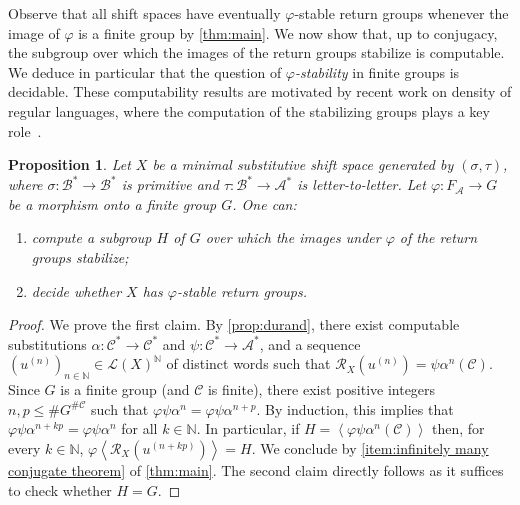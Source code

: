 \documentclass{amsart}
\newcommand*{\N}{\mathbb{N}}
\newcommand*{\ret}{\mathcal{R}}
\newcommand*{\lang}{\mathcal{L}}
\newcommand*{\cA}{\mathcal{A}}
\newcommand*{\cB}{\mathcal{B}}
\newcommand*{\cC}{\mathcal{C}}
\newcommand*{\from}{\colon}
\newcommand*{\card}{\#}
\newcommand*{\gen}[1]{\left\langle #1\right\rangle}
\theoremstyle{plain}
\newtheorem{proposition}[theorem]{Proposition}
\theoremstyle{definition}
\theoremstyle{remark}
\begin{document}
Observe that all shift spaces have eventually $\varphi$-stable return groups whenever the image of $\varphi$ is a finite group by \cref{thm:main}. We now show that, up to conjugacy, the subgroup over which the images of the return groups stabilize is computable. We deduce in particular that the question of \emph{$\varphi$-stability} in finite groups is decidable. These computability results are motivated by recent work on density of regular languages, where the computation of the stabilizing groups plays a key role~\cite{pre/Berthe2024}.
\begin{proposition}\label{P:H computable}
    Let $X$ be a minimal substitutive shift space generated by $(\sigma,\tau)$, where $\sigma\from \cB^* \to \cB^*$ is primitive and $\tau\from \cB^* \to \cA^*$ is letter-to-letter.
    Let $\varphi\from F_\cA \to G$ be a morphism onto a finite group $G$. One can:
    \begin{enumerate}
        \item compute a subgroup $H$ of $G$ over which the images under $\varphi$ of the return groups stabilize;
        \item decide whether $X$ has $\varphi$-stable return groups.
    \end{enumerate}
\end{proposition}

\begin{proof}
    We prove the first claim.
    By \cref{prop:durand}, there exist computable substitutions $\alpha\from \cC^*\to \cC^*$ and $\psi\from \cC^*\to \cA^*$, and a sequence $(u^{(n)})_{n \in \N} \in \lang(X)^\N$ of distinct words such that $\ret_X(u^{(n)}) = \psi \alpha^n(\cC)$.
    Since $G$ is a finite group (and $\cC$ is finite), there exist positive integers $n,p \leq \card G^{\card\cC}$ such that $\varphi \psi \alpha^n = \varphi \psi \alpha^{n+p}$.
    By induction, this implies that $\varphi \psi \alpha^{n+kp} = \varphi \psi \alpha^n$ for all $k \in \N$. In particular, if $H = \gen{\varphi \psi \alpha^n(\cC)}$ then, for every $k \in \N$, $\varphi\gen{\ret_X(u^{(n+kp)})} = H$. We conclude by \cref{item:infinitely many conjugate theorem} of \cref{thm:main}.
    The second claim directly follows as it suffices to check whether $H = G$.
\end{proof}
\end{document}
